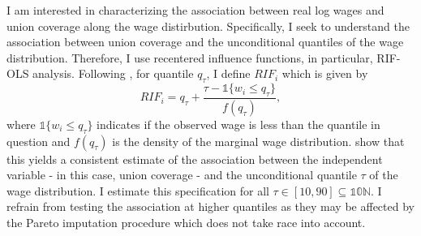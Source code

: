\documentclass[11pt]{article}
\begin{document}
I am interested in characterizing the association between real log wages and union coverage along the wage distirbution. Specifically, I seek to understand the association between union coverage and the unconditional quantiles of the wage distribution. Therefore, I use recentered influence functions, in particular, RIF-OLS analysis. Following \citet{ffl2009}, for quantile $q_\tau$, I define $RIF_i$ which is given by 
\begin{equation}\label{eq:rif}
    RIF_i = q_\tau + \frac{\tau - \mathbb{1}\{w_i \leq q_\tau\}}{f(q_\tau)},
\end{equation}
where $\mathbb{1}\{w_i \leq q_\tau\}$ indicates if the observed wage is less than the quantile in question and $f(q_\tau)$ is the density of the marginal wage distribution. \citet{ffl2009} show that this yields a consistent estimate of the association between the independent variable - in this case, union coverage - and the unconditional quantile $\tau$ of the wage distribution. I estimate this specification for all $\tau \in [10,90]\subseteq \mathbb{10N}$. I refrain from testing the association at higher quantiles as they may be affected by the Pareto imputation procedure which does not take race into account. 
\end{document}
